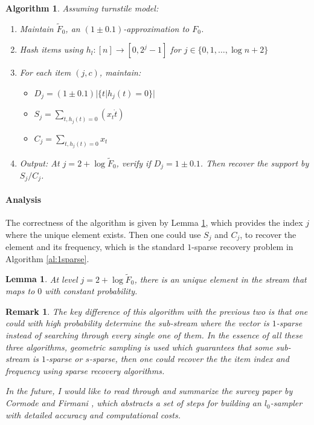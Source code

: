 \documentclass[11pt]{article}
\theoremstyle{plain}
\newtheorem{algorithm}{Algorithm}[section]
\newtheorem{lemma}[theorem]{Lemma}
\newtheorem{remark}[theorem]{Remark}
\begin{document}
\begin{algorithm}
	\label{al:l0sampling-Zhang}
	Assuming turnstile model:
	\begin{enumerate}
		\item Maintain $\tilde{F}_0$, an $(1 \pm 0.1)$-approximation to $F_0$.
		\item Hash items using $h_l: [n]\rightarrow [0,2^j-1]$ for $j\in 
		\{0,1,\dots,\log n+2\}$
		\item For each item $(j,c)$, maintain:
		\begin{itemize}
			\item $D_j = (1\pm 0.1)|\{t|h_j(t)=0\}|$
			\item $S_j = \sum_{t, h_j(t)=0} (x_t\dot t)$
			\item $C_j = \sum_{t, h_j(t)=0} x_t$
		\end{itemize}
	\item Output: At $j =2+\log\tilde{F}_0$, verify if $D_j= 1\pm 0.1$. Then recover 
	the support by $S_j/C_j$.
	\end{enumerate}
	
\end{algorithm}

\paragraph{Analysis} The correctness of the algorithm is given by Lemma 
\ref{le:l0-zhang}, which provides the index $j$ where the unique element exists. 
Then one could use $S_j$ and $C_j$, to recover the element and its frequency, 
which is the standard $1$-sparse recovery problem in Algorithm 
\ref{al:1sparse}. 

\begin{lemma}
	\label{le:l0-zhang}
	At level $j =2+\log\tilde{F}_0$, there is an unique element in the stream that 
	maps to $0$ with constant probability.
\end{lemma}

\begin{remark}
	The key difference of this algorithm with the previous two is that one could 
	with high probability determine the sub-stream where the vector is 
	$1$-sparse instead of searching through every single one of them. In the 
	essence of all these three algorithms, geometric sampling is used which 
	guarantees that some sub-stream is $1$-sparse or $s$-sparse, then one 
	could recover the the item index and frequency using sparse recovery 
	algorithms. 
	
	In the future, I would like to read through and summarize the survey paper by 
	Cormode and Firmani \cite{Cormode14}, which abstracts a set of steps for 
	building an $l_0$-sampler with detailed accuracy and computational costs. 
\end{remark}
\end{document}
